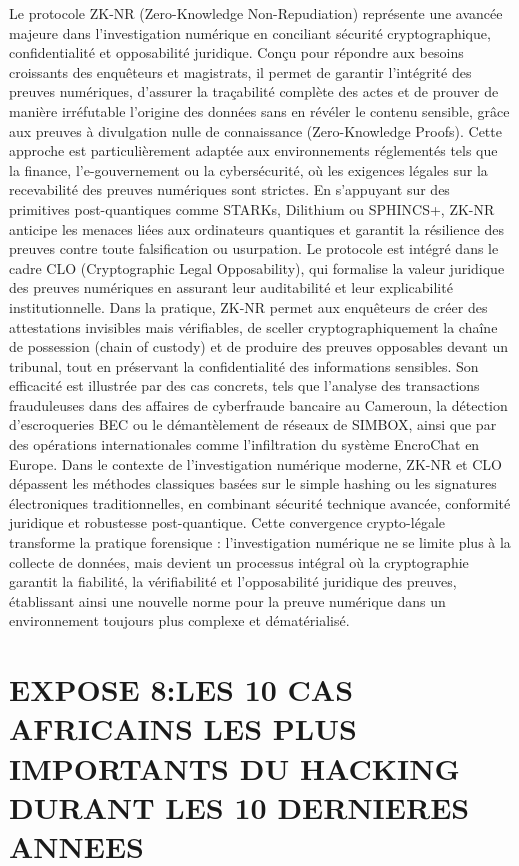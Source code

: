 \documentclass[12pt,a4paper]{report}
\begin{document}
{  
  Le protocole ZK-NR (Zero-Knowledge Non-Repudiation) représente une avancée majeure dans l’investigation numérique en conciliant sécurité cryptographique, confidentialité et opposabilité juridique. Conçu pour répondre aux besoins croissants des enquêteurs et magistrats, il permet de garantir l’intégrité des preuves numériques, d’assurer la traçabilité complète des actes et de prouver de manière irréfutable l’origine des données sans en révéler le contenu sensible, grâce aux preuves à divulgation nulle de connaissance (Zero-Knowledge Proofs). Cette approche est particulièrement adaptée aux environnements réglementés tels que la finance, l’e-gouvernement ou la cybersécurité, où les exigences légales sur la recevabilité des preuves numériques sont strictes. En s’appuyant sur des primitives post-quantiques comme STARKs, Dilithium ou SPHINCS+, ZK-NR anticipe les menaces liées aux ordinateurs quantiques et garantit la résilience des preuves contre toute falsification ou usurpation. Le protocole est intégré dans le cadre CLO (Cryptographic Legal Opposability), qui formalise la valeur juridique des preuves numériques en assurant leur auditabilité et leur explicabilité institutionnelle. Dans la pratique, ZK-NR permet aux enquêteurs de créer des attestations invisibles mais vérifiables, de sceller cryptographiquement la chaîne de possession (chain of custody) et de produire des preuves opposables devant un tribunal, tout en préservant la confidentialité des informations sensibles. Son efficacité est illustrée par des cas concrets, tels que l’analyse des transactions frauduleuses dans des affaires de cyberfraude bancaire au Cameroun, la détection d’escroqueries BEC ou le démantèlement de réseaux de SIMBOX, ainsi que par des opérations internationales comme l’infiltration du système EncroChat en Europe. Dans le contexte de l’investigation numérique moderne, ZK-NR et CLO dépassent les méthodes classiques basées sur le simple hashing ou les signatures électroniques traditionnelles, en combinant sécurité technique avancée, conformité juridique et robustesse post-quantique. Cette convergence crypto-légale transforme la pratique forensique : l’investigation numérique ne se limite plus à la collecte de données, mais devient un processus intégral où la cryptographie garantit la fiabilité, la vérifiabilité et l’opposabilité juridique des preuves, établissant ainsi une nouvelle norme pour la preuve numérique dans un environnement toujours plus complexe et dématérialisé.
  
 \section*{EXPOSE 8:LES 10 CAS AFRICAINS LES PLUS IMPORTANTS DU HACKING DURANT LES 10 DERNIERES ANNEES}\
 
}
\end{document}
